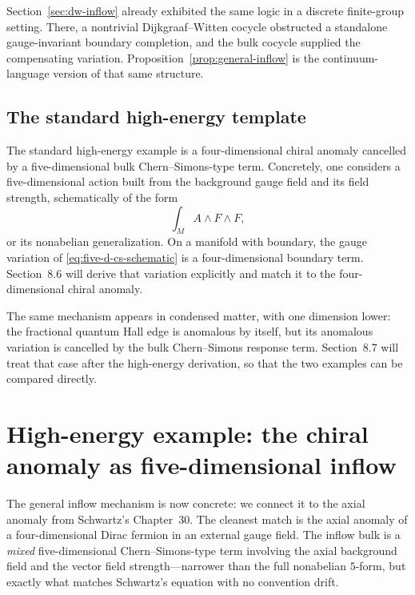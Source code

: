 \begin{remark}\label{rem:inflow-dw-relation}
Section~\ref{sec:dw-inflow} already exhibited the same logic in a discrete finite-group setting. There, a nontrivial Dijkgraaf--Witten cocycle obstructed a standalone gauge-invariant boundary completion, and the bulk cocycle supplied the compensating variation. Proposition~\ref{prop:general-inflow} is the continuum-language version of that same structure.
\end{remark}

\subsection{The standard high-energy template}

The standard high-energy example is a four-dimensional chiral anomaly cancelled by a five-dimensional bulk Chern--Simons-type term. Concretely, one considers a five-dimensional action built from the background gauge field and its field strength, schematically of the form
\begin{equation}\label{eq:five-d-cs-schematic}
\int_M A\wedge F\wedge F,
\end{equation}
or its nonabelian generalization. On a manifold with boundary, the gauge variation of \eqref{eq:five-d-cs-schematic} is a four-dimensional boundary term. Section~8.6 will derive that variation explicitly and match it to the four-dimensional chiral anomaly.

\begin{remark}\label{rem:cm-inflow-forward}
The same mechanism appears in condensed matter, with one dimension lower: the fractional quantum Hall edge is anomalous by itself, but its anomalous variation is cancelled by the bulk Chern--Simons response term. Section~8.7 will treat that case after the high-energy derivation, so that the two examples can be compared directly.
\end{remark}

\section{High-energy example: the chiral anomaly as five-dimensional inflow}\label{sec:hep-inflow}

The general inflow mechanism is now concrete: we connect it to the axial anomaly from Schwartz's Chapter~30.  The cleanest match is the axial anomaly of a four-dimensional Dirac fermion in an external gauge field.  The inflow bulk is a \emph{mixed} five-dimensional Chern--Simons-type term involving the axial background field and the vector field strength---narrower than the full nonabelian $5$-form, but exactly what matches Schwartz's equation with no convention drift.


